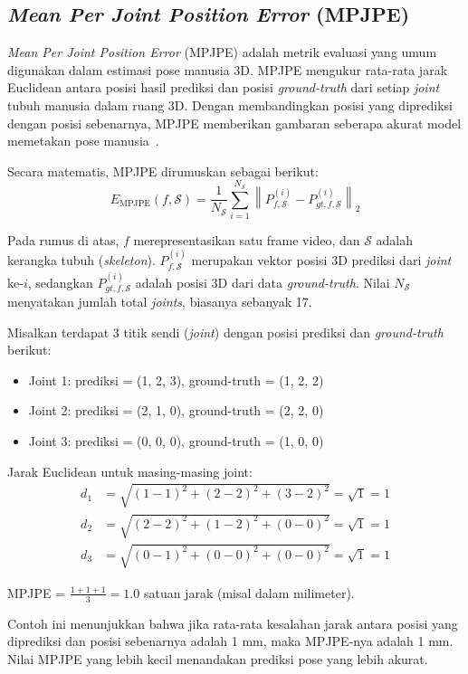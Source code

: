 \subsection{\textit{Mean Per Joint Position Error} (MPJPE)}

\textit{Mean Per Joint Position Error} (MPJPE) adalah metrik evaluasi yang umum digunakan dalam estimasi pose manusia 3D. MPJPE mengukur rata-rata jarak Euclidean antara posisi hasil prediksi dan posisi \textit{ground-truth} dari setiap \textit{joint} tubuh manusia dalam ruang 3D. Dengan membandingkan posisi yang diprediksi dengan posisi sebenarnya, MPJPE memberikan gambaran seberapa akurat model memetakan pose manusia~\cite{WANG2021103225}.

Secara matematis, MPJPE dirumuskan sebagai berikut:
\begin{equation}
    E_{\text{MPJPE}}(f, \mathcal{S}) = \frac{1}{N_\mathcal{S}} \sum_{i=1}^{N_\mathcal{S}} \left\lVert P_{f, \mathcal{S}}^{(i)} - P_{gt, f, \mathcal{S}}^{(i)} \right\rVert_2
    \label{eq:mpjpe}
\end{equation}

Pada rumus di atas, \( f \) merepresentasikan satu frame video, dan \( \mathcal{S} \) adalah kerangka tubuh (\textit{skeleton}). \( P_{f, \mathcal{S}}^{(i)} \) merupakan vektor posisi 3D prediksi dari \textit{joint} ke-\( i \), sedangkan \( P_{gt, f, \mathcal{S}}^{(i)} \) adalah posisi 3D dari data \textit{ground-truth}. Nilai \( N_\mathcal{S} \) menyatakan jumlah total \textit{joints}, biasanya sebanyak 17.

Misalkan terdapat 3 titik sendi (\textit{joint}) dengan posisi prediksi dan \textit{ground-truth} berikut:

\begin{itemize}
    \item Joint 1: prediksi = (1, 2, 3), ground-truth = (1, 2, 2)
    \item Joint 2: prediksi = (2, 1, 0), ground-truth = (2, 2, 0)
    \item Joint 3: prediksi = (0, 0, 0), ground-truth = (1, 0, 0)
\end{itemize}

Jarak Euclidean untuk masing-masing joint:
\begin{align*}
    d_1 &= \sqrt{(1{-}1)^2 + (2{-}2)^2 + (3{-}2)^2} = \sqrt{1} = 1 \\
    d_2 &= \sqrt{(2{-}2)^2 + (1{-}2)^2 + (0{-}0)^2} = \sqrt{1} = 1 \\
    d_3 &= \sqrt{(0{-}1)^2 + (0{-}0)^2 + (0{-}0)^2} = \sqrt{1} = 1
\end{align*}

MPJPE = \( \frac{1 + 1 + 1}{3} = 1.0 \) satuan jarak (misal dalam milimeter).

Contoh ini menunjukkan bahwa jika rata-rata kesalahan jarak antara posisi yang diprediksi dan posisi sebenarnya adalah 1 mm, maka MPJPE-nya adalah 1 mm. Nilai MPJPE yang lebih kecil menandakan prediksi pose yang lebih akurat.







